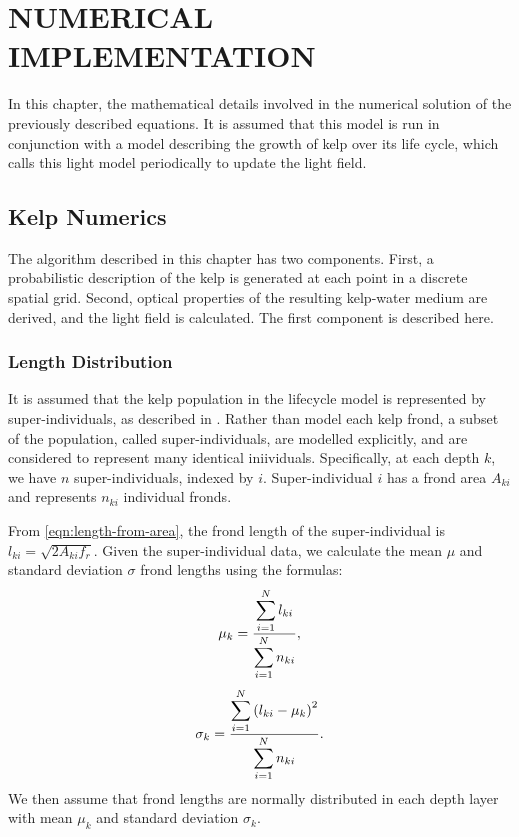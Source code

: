 \chapter{NUMERICAL IMPLEMENTATION}

In this chapter, the mathematical details involved in the numerical solution of the previously described equations.
It is assumed that this model is run in conjunction with a model describing the growth of kelp over its life cycle, which calls this light model periodically to update the light field.

\section{Kelp Numerics}

The algorithm described in this chapter has two components.
First, a probabilistic description of the kelp is generated at each point in a discrete spatial grid.
Second, optical properties of the resulting kelp-water medium are derived, and the light field is calculated.
The first component is described here.

\subsection{Length Distribution}

It is assumed that the kelp population in the lifecycle model is represented by super-individuals, as described in \citep{scheffer_super-individuals_1994}.
Rather than model each kelp frond, a subset of the population, called super-individuals, are modelled explicitly, and are considered to represent many identical iniividuals.
Specifically, at each depth $k$, we have $n$ super-individuals, indexed by $i$.
Super-individual $i$ has a frond area $A_{ki}$ and represents $n_{ki}$ individual fronds.

From \eqref{eqn:length-from-area}, the frond length of the super-individual is $l_{ki} = \sqrt{2A_{ki}f_r}$.
Given the super-individual data, we calculate the mean $\mu$ and standard deviation $\sigma$ frond
lengths using the formulas:
\begin{equation}
  \mu_k = \frac{\displaystyle \sum_{i=1}^N l_{ki}}{\displaystyle \sum_{i=1}^N n_{ki}},
\end{equation}
\begin{equation}
  \sigma_k = \frac{\displaystyle \sum_{i=1}^N \left( l_{ki} - \mu_k \right)^2}{\displaystyle \sum_{i=1}^N n_{ki}}.
\end{equation}
We then assume that frond lengths are normally distributed in each depth layer
with mean $\mu_k$ and standard deviation $\sigma_k$.

